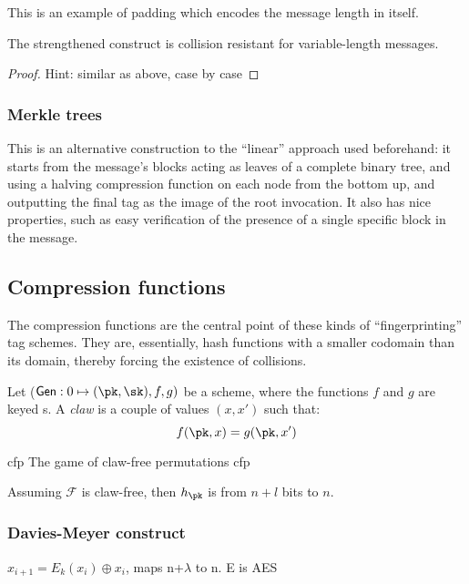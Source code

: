 This is an example of padding which encodes the message length in itself.

\begin{theorem}
    The strengthened construct is collision resistant for variable-length messages.
\end{theorem}

\begin{proof}
    Hint: similar as above, case by case
\end{proof}

\subsubsection{Merkle trees}

This is an alternative construction to the ``linear'' approach used beforehand: it starts from the message's blocks acting as leaves of a complete binary tree, and using a halving compression function on each node from the bottom up, and outputting the final tag as the image of the root invocation. It also has nice properties, such as easy verification of the presence of a single specific block in the message.

\subsection{Compression functions}

The compression functions are the central point of these kinds of ``fingerprinting'' tag schemes. They are, essentially, hash functions with a smaller codomain than its domain, thereby forcing the existence of collisions.

Let ($\textsf{Gen} : 0 \mapsto (\pk, \sk), f, g)$ be a \pke{} scheme, where the functions $f$ and $g$ are keyed \prp{}s. A \emph{claw} is a couple of values $(x, x')$ such that:
\[
    f(\pk, x) = g(\pk, x')
\]

\begin{cryptogame}
    {cfp}
    {The game of claw-free permutations}
    {cfp}
    

\end{cryptogame}

\begin{theorem}
    Assuming $\mathcal{F}$ is claw-free, then $h_\pk$ is \crh{} from $n + l$ bits to $n$.
\end{theorem}

\subsubsection{Davies-Meyer construct}

\begin{definition}
    $x_{i + 1} = E_k(x_i) \oplus x_i$, maps n+$\lambda$ to n. E is AES
\end{definition}
